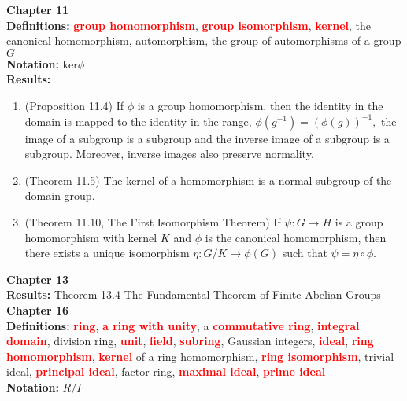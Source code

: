 \documentclass[12pt]{article}
\newcommand{\bfr}[1]{\textbf{\textcolor{red}{#1}}}
\begin{document}
\noindent \textbf{Chapter 11}\\

\noindent \textbf{Definitions:} \bfr{group homomorphism}, \bfr{group isomorphism}, \bfr{kernel}, the canonical homomorphism, automorphism, the group of automorphisms of a group $G$\\

\noindent \textbf{Notation:} $\text{ker}\phi$\\

\noindent \textbf{Results:} \\
\begin{enumerate}
	\item (Proposition 11.4) If $\phi$ is a group homomorphism, then the identity in the domain is mapped to the identity in the range,  $\phi(g^{-1})=(\phi(g))^{-1},$ the image of a subgroup is a subgroup and the inverse image of a subgroup is a subgroup. Moreover, inverse images also preserve normality.
	\item (Theorem 11.5)  The kernel of a homomorphism is a normal subgroup of the domain group.
	\item (Theorem 11.10, The First Isomorphism Theorem) If $\psi: G \to H$ is a group homomorphism with kernel $K$ and $\phi$ is the canonical homomorphism, then there exists a unique isomorphism $\eta: G/K \to \phi(G)$ such that $\psi=\eta \circ \phi.$
\end{enumerate}

\noindent \textbf{Chapter 13}\\

%

\noindent \textbf{Results:} Theorem 13.4 The Fundamental Theorem of Finite Abelian Groups\\

\noindent \textbf{Chapter 16}\\

\noindent \textbf{Definitions:} \bfr{ring}, \bfr{a ring with unity}, a \bfr{commutative ring}, \bfr{integral domain}, division ring, \bfr{unit}, \bfr{field}, \bfr{subring}, Gaussian integers, \bfr{ideal}, \bfr{ring homomorphism}, \bfr{kernel} of a ring homomorphism, \bfr{ring isomorphism},  trivial ideal, \bfr{principal ideal}, factor ring, \bfr{maximal ideal}, \bfr{prime ideal} \\

\noindent \textbf{Notation:} $R/I$\\
\end{document}

